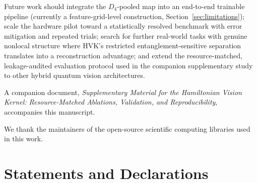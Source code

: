 \documentclass[pdflatex,sn-basic]{sn-jnl}
\begin{document}
Future work should integrate the $D_4$-pooled map into an end-to-end trainable
pipeline (currently a feature-grid-level construction,
Section~\ref{sec:limitations}); scale the hardware pilot toward a statistically
resolved benchmark with error mitigation and repeated trials; search for further
real-world tasks with genuine nonlocal structure where HVK's restricted
entanglement-sensitive separation translates into a reconstruction advantage; and
extend the resource-matched, leakage-audited evaluation protocol used in the
companion supplementary study to other hybrid quantum vision architectures.

\backmatter


A companion document, \textit{Supplementary Material for the Hamiltonian Vision
Kernel: Resource-Matched Ablations, Validation, and Reproducibility}, accompanies
this manuscript.


We thank the maintainers of the open-source scientific computing libraries used
in this work.

\section*{Statements and Declarations}
\end{document}
